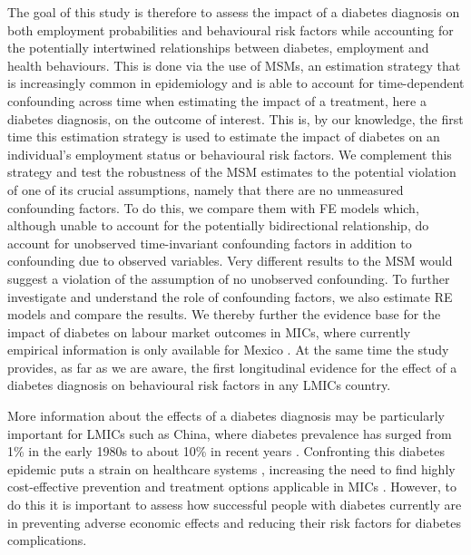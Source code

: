The goal of this study is therefore to assess the impact of a diabetes diagnosis on both employment probabilities and behavioural risk factors while accounting for the potentially intertwined relationships between diabetes, employment and health behaviours. This is done via the use of \acp{MSM}, an estimation strategy that is increasingly common in epidemiology and is able to account for time-dependent confounding across time \parencite{Robins2000} when estimating the impact of a treatment, here a diabetes diagnosis, on the outcome of interest. This is, by our knowledge, the first time this estimation strategy is used to estimate the impact of diabetes on an individual's employment status or behavioural risk factors. We complement this strategy and test the robustness of the \ac{MSM} estimates to the potential violation of one of its crucial assumptions, namely that there are no unmeasured confounding factors. To do this, we compare them with \ac{FE} models which, although unable to account for the potentially bidirectional relationship, do account for unobserved time-invariant confounding factors in addition to confounding due to observed variables. Very different results to the \ac{MSM} would suggest a violation of the assumption of no unobserved confounding. To further investigate and understand the role of confounding factors, we also estimate \ac{RE} models and compare the results.  We thereby further \DIFdelbegin {}\DIFdelend \DIFaddbegin {}\DIFaddend the evidence base for the impact of diabetes on labour market outcomes in \acp{MIC}, where currently empirical information is only available for Mexico \parencite{Seuring2016}. At the same time the study provides, as far as we are aware, the first longitudinal evidence for the effect of a diabetes diagnosis on behavioural risk factors in any \acp{LMIC}  country.

 
More information about the effects of a diabetes diagnosis may be particularly important for \acp{LMIC} such as China, where diabetes prevalence has surged from 1\% in the early 1980s to about 10\% in recent years \autocite{Hu2011,Risk2016}. Confronting this diabetes epidemic puts a strain on healthcare systems \parencite{Seuring2015a}, increasing the need to find highly cost-effective prevention and treatment options applicable in \acp{MIC} \parencite{WHOresearchpriorities2010}. However, to do this it is important to assess how successful people with diabetes currently are in preventing adverse economic effects and reducing their risk factors for diabetes complications.


